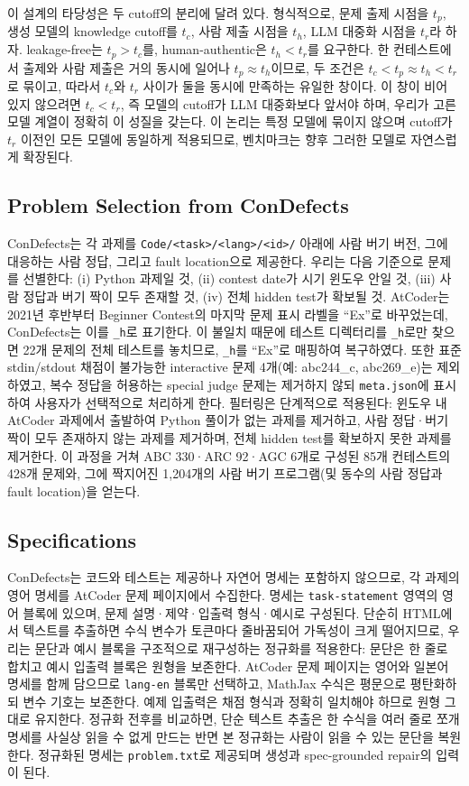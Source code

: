 \documentclass[10pt,conference]{IEEEtran}
\begin{document}
이 설계의 타당성은 두 cutoff의 분리에 달려 있다. 형식적으로, 문제 출제 시점을 $t_p$, 생성 모델의 knowledge cutoff를 $t_c$, 사람 제출 시점을 $t_h$, LLM 대중화 시점을 $t_r$라 하자. leakage-free는 $t_p > t_c$를, human-authentic은 $t_h < t_r$를 요구한다. 한 컨테스트에서 출제와 사람 제출은 거의 동시에 일어나 $t_p \approx t_h$이므로, 두 조건은 $t_c < t_p \approx t_h < t_r$로 묶이고, 따라서 $t_c$와 $t_r$ 사이가 둘을 동시에 만족하는 유일한 창이다. 이 창이 비어 있지 않으려면 $t_c < t_r$, 즉 모델의 cutoff가 LLM 대중화보다 앞서야 하며, 우리가 고른 모델 계열이 정확히 이 성질을 갖는다. 이 논리는 특정 모델에 묶이지 않으며 cutoff가 $t_r$ 이전인 모든 모델에 동일하게 적용되므로, 벤치마크는 향후 그러한 모델로 자연스럽게 확장된다.

\subsection{Problem Selection from ConDefects}
ConDefects는 각 과제를 \texttt{Code/<task>/<lang>/<id>/} 아래에 사람 버기 버전, 그에 대응하는 사람 정답, 그리고 fault location으로 제공한다. 우리는 다음 기준으로 문제를 선별한다: (i) Python 과제일 것, (ii) contest date가 시기 윈도우 안일 것, (iii) 사람 정답과 버기 짝이 모두 존재할 것, (iv) 전체 hidden test가 확보될 것. AtCoder는 2021년 후반부터 Beginner Contest의 마지막 문제 표시 라벨을 ``Ex''로 바꾸었는데, ConDefects는 이를 \texttt{\_h}로 표기한다. 이 불일치 때문에 테스트 디렉터리를 \texttt{\_h}로만 찾으면 22개 문제의 전체 테스트를 놓치므로, \texttt{\_h}를 ``Ex''로 매핑하여 복구하였다. 또한 표준 stdin/stdout 채점이 불가능한 interactive 문제 4개(예: abc244\_c, abc269\_e)는 제외하였고, 복수 정답을 허용하는 special judge 문제는 제거하지 않되 \texttt{meta.json}에 표시하여 사용자가 선택적으로 처리하게 한다. 필터링은 단계적으로 적용된다: 윈도우 내 AtCoder 과제에서 출발하여 Python 풀이가 없는 과제를 제거하고, 사람 정답·버기 짝이 모두 존재하지 않는 과제를 제거하며, 전체 hidden test를 확보하지 못한 과제를 제거한다. 이 과정을 거쳐 ABC 330·ARC 92·AGC 6개로 구성된 85개 컨테스트의 428개 문제와, 그에 짝지어진 1{,}204개의 사람 버기 프로그램(및 동수의 사람 정답과 fault location)을 얻는다.

\subsection{Specifications}
ConDefects는 코드와 테스트는 제공하나 자연어 명세는 포함하지 않으므로, 각 과제의 영어 명세를 AtCoder 문제 페이지에서 수집한다. 명세는 \texttt{task-statement} 영역의 영어 블록에 있으며, 문제 설명·제약·입출력 형식·예시로 구성된다. 단순히 HTML에서 텍스트를 추출하면 수식 변수가 토큰마다 줄바꿈되어 가독성이 크게 떨어지므로, 우리는 문단과 예시 블록을 구조적으로 재구성하는 정규화를 적용한다: 문단은 한 줄로 합치고 예시 입출력 블록은 원형을 보존한다. AtCoder 문제 페이지는 영어와 일본어 명세를 함께 담으므로 \texttt{lang-en} 블록만 선택하고, MathJax 수식은 평문으로 평탄화하되 변수 기호는 보존한다. 예제 입출력은 채점 형식과 정확히 일치해야 하므로 원형 그대로 유지한다. 정규화 전후를 비교하면, 단순 텍스트 추출은 한 수식을 여러 줄로 쪼개 명세를 사실상 읽을 수 없게 만드는 반면 본 정규화는 사람이 읽을 수 있는 문단을 복원한다. 정규화된 명세는 \texttt{problem.txt}로 제공되며 생성과 spec-grounded repair의 입력이 된다.
\end{document}
